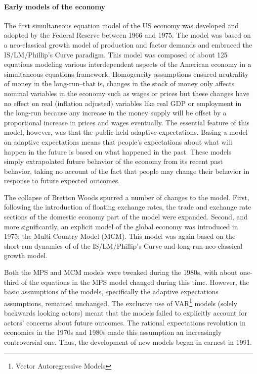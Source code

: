 \documentclass[a4paper]{article}\usepackage{graphicx, color}
\begin{document}
\paragraph{Early models of the economy}
The first simultaneous equation model of the US economy was developed and adopted by the Federal Reserve between 1966 and 1975. The model was based on a neo-classical growth model of production and factor demands and embraced the IS/LM/Phillip's Curve paradigm. This model was composed of about 125 equations modeling various interdependent aspects of the American economy in a simultaneous equations framework. Homogeneity assumptions ensured neutrality of money in the long-run--that is, changes in the stock of money only affects nominal variables in the economy such as wages or prices but these changes have no effect on real (inflation adjusted) variables like real GDP or employment in the long-run because any increase in the money supply will be offset by a proportional increase in prices and wages eventually. The essential feature of this model, however, was that the public held adaptive expectations. Basing a model on adaptive expectations means that people's expectations about what will happen in the future is based on what happened in the past. These models simply extrapolated future behavior of the economy from its recent past behavior, taking no account of the fact that people may change their behavior in response to future expected outcomes.

The collapse of Bretton Woods spurred a number of changes to the model. First, following the introduction of floating exchange rates, the trade and exchange rate sections of the domestic economy part of the model were expanded. Second, and more significantly, an explicit model of the global economy was introduced in 1975: the Multi-Country Model (MCM). This model was again based on the short-run dynamics of of the IS/LM/Phillip's Curve and long-run neo-classical growth model.

Both the MPS and MCM models were tweaked during the 1980s, with about one-third of the equations in the MPS model changed during this time. However, the basic assumptions of the models, specifically the adaptive expectations assumptions, remained unchanged. The exclusive use of VAR\footnote{Vector Autoregressive Models} models (solely backwards looking actors) meant that the models failed to explicitly account for actors' concerns about future outcomes. The rational expectations revolution in economics in the 1970s and 1980s made this assumption an increasingly controversial one. Thus, the development of new models began in earnest in 1991.
 
\end{document}
